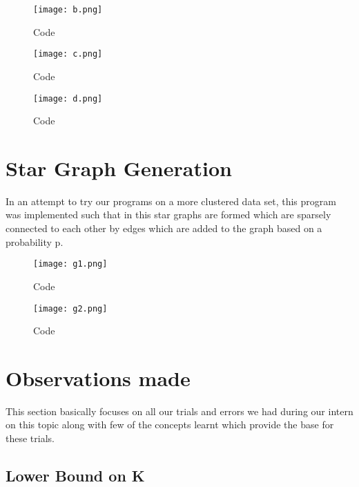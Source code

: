 \documentclass[12pt,a4paper,onecolumn]{article}
\begin{document}
\begin{figure}[H]
 \texttt{[image: b.png]}
  \caption{Code}
  \label{Figure 5}
\end{figure}

\begin{figure}[H]
 \texttt{[image: c.png]}
  \caption{Code}
  \label{Figure 6}
\end{figure}

\begin{figure}[H]
 \texttt{[image: d.png]}
  \caption{Code}
  \label{Figure 7}
\end{figure}

\section{Star Graph Generation}
In an attempt to try our programs on a more clustered data set, this program was implemented such that in this star graphs are formed which are sparsely connected to each other by edges which are added to the graph based on a probability p.

\begin{figure}[H]
 \texttt{[image: g1.png]}
  \caption{Code}
  \label{Figure 8}
\end{figure}

\begin{figure}[H]
 \texttt{[image: g2.png]}
  \caption{Code}
  \label{Figure 9}
\end{figure}

\section{Observations made}
This section basically focuses on all our trials and errors we had during our intern on this topic along with few of the concepts learnt which provide the base for these trials.
\subsection{Lower Bound on K}
\end{document}
